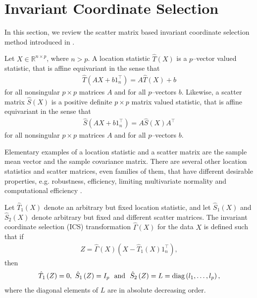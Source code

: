 \documentclass{llncs}
\begin{document}
\section{Invariant Coordinate Selection}\label{secpca}


In this section, we review the scatter matrix based invariant coordinate selection method introduced in \cite{TY}.


Let $X \in \mathbb{R}^{n\times p}$, where $n>p$. A location statistic $\hat{T}\left(X\right)$  is a $p$--vector valued statistic,  that is affine equivariant in the sense that
\begin{align*}
\hat{T}\left(AX+b1_n^\top\right)=A\hat{T}\left(X\right)+b
\end{align*}
for all nonsingular $p\times p$ matrices $A$ and for all $p$--vectors
$b$. Likewise, a  scatter matrix $\hat{S}\left(X\right)$ is a positive definite  $p\times p$ matrix valued statistic, that is affine
equivariant in the sense that
\begin{align*}
\hat{S}\left(AX+b1_n^\top\right)=A\hat{S}\left(X\right)A^\top
\end{align*}
for all nonsingular $p\times p$ matrices $A$ and for all $p$--vectors
$b$.



Elementary examples of a location statistic and a scatter matrix are
the sample mean vector and the sample covariance matrix. There are several other location statistics and scatter matrices, even families of them, that have different desirable properties, e.g. robustness, efficiency, limiting multivariate normality and computational efficiency \cite{S3,S2,MMY}.





Let $\hat{T}_1\left(X\right)$ denote an arbitrary but fixed location statistic, and let $\hat{S}_1\left(X\right)$ and $\hat{S}_2\left(X\right)$ denote  arbitrary but fixed and different scatter matrices. The invariant coordinate selection (ICS) transformation $\hat{\Gamma}\left(X\right)$ for the data $X$ is  defined such that if 
\begin{align*}
Z=\hat{\Gamma}\left(X\right)\left(X-\hat{T}_1\left(X\right)1_n^\top \right),
 \end{align*}
 then
\begin{align*}
\hat{T}_1\left(Z\right)=0, \  \hat{S}_1\left(Z\right)=I_p  \ \mbox{ and } \  \hat{S}_2\left(Z\right)=L=\textnormal{diag}\left(l_1, \ldots, l_p\right),
\end{align*}
where the diagonal elements of  $L$ are in absolute decreasing order.
\end{document}
